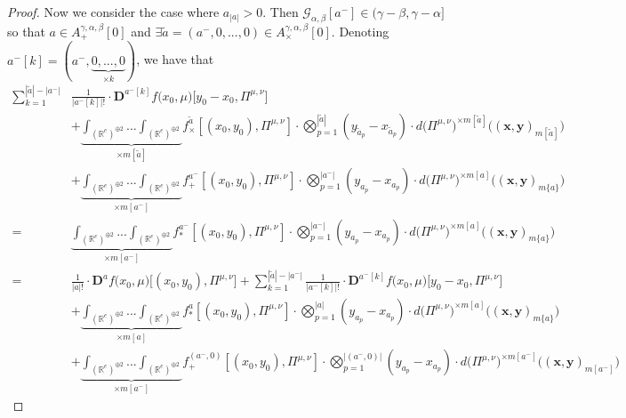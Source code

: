 \documentclass[a4paper,11pt,twoside]{article}
\numberwithin{equation}{section}
\theoremstyle{plain}
\newcommand{\bR}{\mathbb{R}}
\newcommand{\scG}{\mathscr{G}}
\newcommand{\rD}{\mathbf{D}}
\newcommand{\1}{\mathbbm{1}}
\begin{document}
\begin{proof}
		Now we consider the case where $a_{|a|} >0$. Then $\scG_{\alpha, \beta}[a^-] \in (\gamma-\beta, \gamma-\alpha]$ so that $a\in A_{+}^{\gamma, \alpha, \beta}[0]$ and $\exists \tilde{a} = (a^-, 0, ..., 0)\in A_{\times}^{\gamma, \alpha, \beta}[0]$. Denoting $a^-[k]=(a^-, \underbrace{0, ..., 0}_{\times k})$, we have that
		\begin{align}
			\nonumber
			\sum_{k=1}^{|\tilde{a}| - |a^-|}& \frac{1}{|a^-[k]|!} \cdot \rD^{a^-[k]} f\Big( x_0, \mu \Big)\Big[ y_0- x_0, \Pi^{\mu, \nu}\Big] 
			\\
			\nonumber
			&+ \underbrace{ \int_{(\bR^e)^{\oplus 2}} ... \int_{(\bR^e)^{\oplus 2}} }_{\times m[\tilde{a}]} f_{\times}^{\tilde{a}}[ (x_0, y_0), \Pi^{\mu, \nu}] 
			\cdot 
			\bigotimes_{p=1}^{|\tilde{a}|} ( y_{\tilde{a}_p} - x_{\tilde{a}_p}) \cdot d\big( \Pi^{\mu, \nu}\big)^{\times m[\tilde{a}]} \Big( (\boldsymbol{x}, \boldsymbol{y})_{m[\tilde{a}]}\Big)
			\\
			\nonumber
			&+ \underbrace{ \int_{(\bR^e)^{\oplus 2}} ... \int_{(\bR^e)^{\oplus 2}} }_{\times m[a^-]} f_{+}^{a^-}[ (x_0, y_0), \Pi^{\mu, \nu}] 
			\cdot 
			\bigotimes_{p=1}^{|a^-|} ( y_{a_p} - x_{a_p}) \cdot d\big( \Pi^{\mu, \nu}\big)^{\times m[a]} \Big( (\boldsymbol{x}, \boldsymbol{y})_{m\{a\}}\Big)
			\\
			\nonumber
			=&
			\underbrace{ \int_{(\bR^e)^{\oplus 2}} ... \int_{(\bR^e)^{\oplus 2}} }_{\times m[a^-]} f_{\ast}^{a^-}[ (x_0, y_0), \Pi^{\mu, \nu}] 
			\cdot 
			\bigotimes_{p=1}^{|a^-|} ( y_{a_p} - x_{a_p}) \cdot d\big( \Pi^{\mu, \nu}\big)^{\times m[a]} \Big( (\boldsymbol{x}, \boldsymbol{y})_{m\{a\}}\Big)
			\\
			\nonumber
			=& 
			\frac{1}{|a|!} \cdot \rD^{a} f\Big(x_0, \mu\Big)\Big[ (x_0, y_0), \Pi^{\mu, \nu} \Big]
			+\sum_{k=1}^{|\tilde{a}| - |a^-|} \frac{1}{|a^-[k]|!} \cdot \rD^{a^-[k]} f\Big( x_0, \mu \Big)\Big[ y_0- x_0, \Pi^{\mu, \nu}\Big] 
			\\
			\nonumber
			&+\underbrace{ \int_{(\bR^e)^{\oplus 2}} ... \int_{(\bR^e)^{\oplus 2}} }_{\times m[a]} f_{\ast}^{a}[ (x_0, y_0), \Pi^{\mu, \nu}] 
			\cdot 
			\bigotimes_{p=1}^{|a|} ( y_{a_p} - x_{a_p}) \cdot d\big( \Pi^{\mu, \nu}\big)^{\times m[a]} \Big( (\boldsymbol{x}, \boldsymbol{y})_{m\{a\}}\Big)
			\\
			&
			\nonumber
			+\underbrace{ \int_{(\bR^e)^{\oplus 2}} ... \int_{(\bR^e)^{\oplus 2}} }_{\times m[a^-]} f_{+}^{(a^-, 0)}[ (x_0, y_0), \Pi^{\mu, \nu}] 
			\cdot 
			\bigotimes_{p=1}^{|(a^-, 0)|} ( y_{a_p} - x_{a_p}) \cdot d\big( \Pi^{\mu, \nu}\big)^{\times m[a^-]} \Big( (\boldsymbol{x}, \boldsymbol{y})_{m[a^-]}\Big)

\end{align}
\end{proof}
\end{document}
